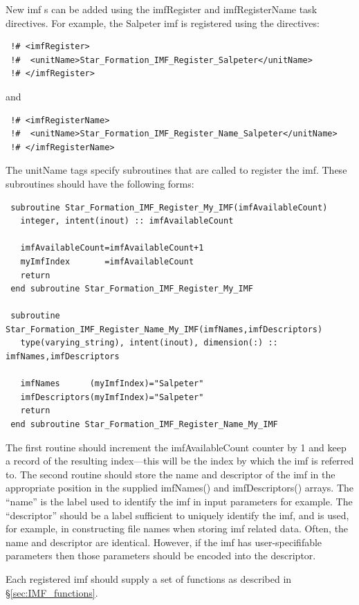 New \gls{imf} s can be added using the {\normalfont \ttfamily imfRegister} and {\normalfont \ttfamily imfRegisterName} task directives. For example, the {\normalfont \ttfamily Salpeter} \gls{imf} is registered using the directives:
\begin{verbatim}
 !# <imfRegister>
 !#  <unitName>Star_Formation_IMF_Register_Salpeter</unitName>
 !# </imfRegister>
\end{verbatim}
and
\begin{verbatim}
 !# <imfRegisterName>
 !#  <unitName>Star_Formation_IMF_Register_Name_Salpeter</unitName>
 !# </imfRegisterName>
\end{verbatim}
The {\normalfont \ttfamily unitName} tags specify subroutines that are called to register the \gls{imf}. These subroutines should have the following forms:
\begin{verbatim}
 subroutine Star_Formation_IMF_Register_My_IMF(imfAvailableCount)
   integer, intent(inout) :: imfAvailableCount

   imfAvailableCount=imfAvailableCount+1
   myImfIndex       =imfAvailableCount
   return
 end subroutine Star_Formation_IMF_Register_My_IMF

 subroutine Star_Formation_IMF_Register_Name_My_IMF(imfNames,imfDescriptors)
   type(varying_string), intent(inout), dimension(:) :: imfNames,imfDescriptors

   imfNames      (myImfIndex)="Salpeter"
   imfDescriptors(myImfIndex)="Salpeter"
   return
 end subroutine Star_Formation_IMF_Register_Name_My_IMF
\end{verbatim}
The first routine should increment the {\normalfont \ttfamily imfAvailableCount} counter by 1 and keep a record of the resulting index---this will be the index by which the \gls{imf} is referred to. The second routine should store the name and descriptor of the \gls{imf} in the appropriate position in the supplied {\normalfont \ttfamily imfNames()} and {\normalfont \ttfamily imfDescriptors()} arrays. The ``name'' is the label used to identify the \gls{imf} in input parameters for example. The ``descriptor'' should be a label sufficient to uniquely identify the \gls{imf}, and is used, for example, in constructing file names when storing \gls{imf} related data. Often, the name and descriptor are identical. However, if the \gls{imf} has user-specififable parameters then those parameters should be encoded into the descriptor.

Each registered \gls{imf} should supply a set of functions as described in \S\ref{sec:IMF_functions}.

